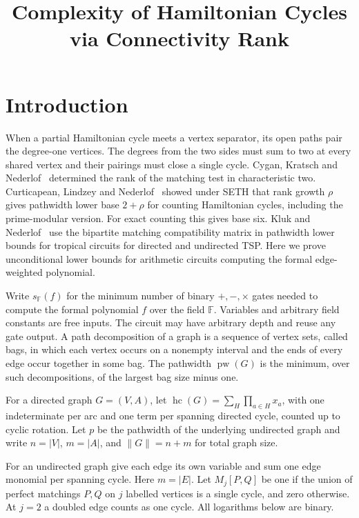 \documentclass[11pt]{article}
\title{Complexity of Hamiltonian Cycles via Connectivity Rank}
\author{}
\date{}
\theoremstyle{definition}
\newcommand{\F}{\mathbb F}
\newcommand{\pw}{\operatorname{pw}}
\newcommand{\hc}{\operatorname{hc}}
\begin{document}
\maketitle

\section{Introduction}
When a partial Hamiltonian cycle meets a vertex separator, its open paths pair the degree-one vertices. The degrees from the two sides must sum to two at every shared vertex and their pairings must close a single cycle. Cygan, Kratsch and Nederlof~\cite{ckn} determined the rank of the matching test in characteristic two. Curticapean, Lindzey and Nederlof~\cite[Theorems~1.1--1.3]{cln} showed under SETH that rank growth \(\rho\) gives pathwidth lower base \(2+\rho\) for counting Hamiltonian cycles, including the prime-modular version. For exact counting this gives base six. Kluk and Nederlof~\cite[Theorems~1.2--1.3]{kluk-nederlof} use the bipartite matching compatibility matrix in pathwidth lower bounds for tropical circuits for directed and undirected TSP. Here we prove unconditional lower bounds for arithmetic circuits computing the formal edge-weighted polynomial.

Write \(s_{\F}(f)\) for the minimum number of binary \(+,-,\times\) gates needed to compute the formal polynomial \(f\) over the field \(\F\). Variables and arbitrary field constants are free inputs. The circuit may have arbitrary depth and reuse any gate output. A path decomposition of a graph is a sequence of vertex sets, called bags, in which each vertex occurs on a nonempty interval and the ends of every edge occur together in some bag. The pathwidth \(\pw(G)\) is the minimum, over such decompositions, of the largest bag size minus one.

For a directed graph \(G=(V,A)\), let \(\hc(G)=\sum_H\prod_{a\in H}x_a\), with one indeterminate per arc and one term per spanning directed cycle, counted up to cyclic rotation. Let \(p\) be the pathwidth of the underlying undirected graph and write \(n=|V|\), \(m=|A|\), and \(\|G\|=n+m\) for total graph size.

For an undirected graph give each edge its own variable and sum one edge monomial per spanning cycle. Here \(m=|E|\). Let \(M_j[P,Q]\) be one if the union of perfect matchings \(P,Q\) on \(j\) labelled vertices is a single cycle, and zero otherwise. At \(j=2\) a doubled edge counts as one cycle. All logarithms below are binary.
\end{document}
